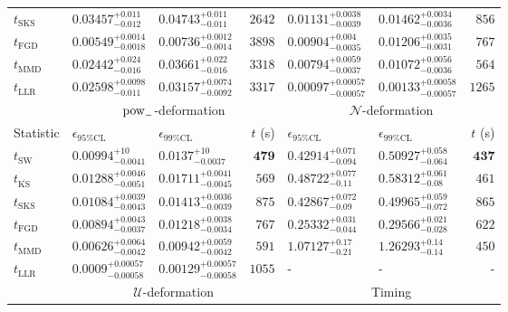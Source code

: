 \begin{tabular}{l|llr|llr}
	$t_{\mathrm{SKS}}$ & $0.03457_{-0.012}^{+0.011}$ & $0.04743_{-0.011}^{+0.011}$ & $2642$ & $0.01131_{-0.0039}^{+0.0038}$ & $0.01462_{-0.0036}^{+0.0034}$ & $856$ \\
	$t_{\mathrm{FGD}}$ & ${\mathbf{0.00549_{-0.0018}^{+0.0014}}}$ & ${\mathbf{0.00736_{-0.0014}^{+0.0012}}}$ & $3898$ & $0.00904_{-0.0035}^{+0.004}$ & $0.01206_{-0.0031}^{+0.0035}$ & $767$ \\
	$t_{\mathrm{MMD}}$ & $0.02442_{-0.016}^{+0.024}$ & $0.03661_{-0.016}^{+0.022}$ & $3318$ & ${\mathbf{0.00794_{-0.0037}^{+0.0059}}}$ & ${\mathbf{0.01072_{-0.0036}^{+0.0056}}}$ & $564$ \\
	$t_{\mathrm{LLR}}$ & $0.02598_{-0.011}^{+0.0098}$ & $0.03157_{-0.0092}^{+0.0074}$ & $3317$ & $0.00097_{-0.00057}^{+0.00057}$ & $0.00133_{-0.00057}^{+0.00058}$ & $1265$ \\
	\toprule
	\multicolumn{1}{c}{} & \multicolumn{3}{c}{$\rm{pow}_{-}$-deformation} & \multicolumn{3}{c}{$\mathcal{N}$-deformation} \\
	Statistic & $\epsilon_{95\%\mathrm{CL}}$ & $\epsilon_{99\%\mathrm{CL}}$ & $t$ (s) & $\epsilon_{95\%\mathrm{CL}}$ & $\epsilon_{99\%\mathrm{CL}}$ & $t$ (s) \\
	\midrule
	$t_{\mathrm{SW}}$ & $0.00994_{-0.0041}^{+10}$ & $0.0137_{-0.0037}^{+10}$ & ${\mathbf{479}}$ & $0.42914_{-0.094}^{+0.071}$ & $0.50927_{-0.064}^{+0.058}$ & ${\mathbf{437}}$ \\
	$t_{\overline{\mathrm{KS}}}$ & $0.01288_{-0.0051}^{+0.0046}$ & $0.01711_{-0.0045}^{+0.0041}$ & $569$ & $0.48722_{-0.11}^{+0.077}$ & $0.58312_{-0.08}^{+0.061}$ & $461$ \\
	$t_{\mathrm{SKS}}$ & $0.01084_{-0.0043}^{+0.0039}$ & $0.01413_{-0.0039}^{+0.0036}$ & $875$ & $0.42867_{-0.09}^{+0.072}$ & $0.49965_{-0.072}^{+0.059}$ & $865$ \\
	$t_{\mathrm{FGD}}$ & $0.00894_{-0.0037}^{+0.0043}$ & $0.01218_{-0.0034}^{+0.0038}$ & $767$ & ${\mathbf{0.25332_{-0.044}^{+0.031}}}$ & ${\mathbf{0.29566_{-0.028}^{+0.021}}}$ & $622$ \\
	$t_{\mathrm{MMD}}$ & ${\mathbf{0.00626_{-0.0042}^{+0.0064}}}$ & ${\mathbf{0.00942_{-0.0042}^{+0.0059}}}$ & $591$ & $1.07127_{-0.21}^{+0.17}$ & $1.26293_{-0.14}^{+0.14}$ & $450$ \\
	$t_{\mathrm{LLR}}$ & $0.0009_{-0.00058}^{+0.00057}$ & $0.00129_{-0.00058}^{+0.00057}$ & $1055$ & - & - & - \\
	\toprule
	\multicolumn{1}{c}{} & \multicolumn{3}{c}{$\mathcal{U}$-deformation} & \multicolumn{3}{c}{Timing} \\

\end{tabular}
